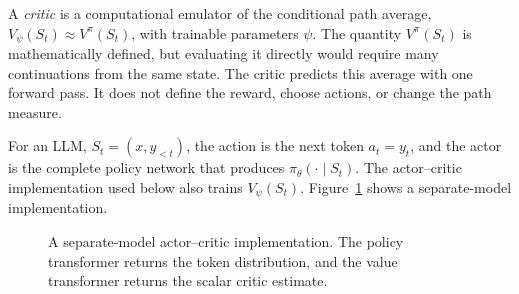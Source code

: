 \documentclass[11pt]{article}
\begin{document}
A \emph{critic} is a computational emulator of the conditional path average,
\(V_\psi(S_t)\approx V^\pi(S_t)\), with trainable parameters \(\psi\).  The
quantity \(V^\pi(S_t)\) is mathematically defined, but evaluating it directly
would require many continuations from the same state.  The critic predicts
this average with one forward pass.  It does not define the reward, choose
actions, or change the path measure.

For an LLM, \(S_t=(x,y_{<t})\), the action is the next token \(a_t=y_t\), and
the actor is the complete policy network that produces
\(\pi_\theta(\cdot\mid S_t)\).  The actor--critic implementation used below
also trains \(V_\psi(S_t)\).  Figure~\ref{fig:actor-critic-interface} shows a
separate-model implementation.

\begin{figure}[ht]
    \centering
    \caption{A separate-model actor--critic implementation.  The policy transformer
    returns the token distribution, and the value transformer returns the
    scalar critic estimate.}
    \label{fig:actor-critic-interface}
\end{figure}
\end{document}
